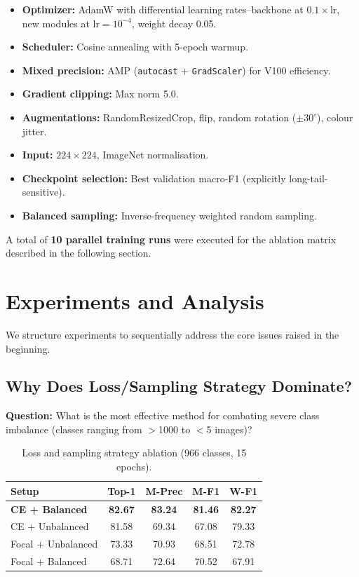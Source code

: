 \documentclass[10pt, twocolumn]{article}
\begin{document}
\begin{itemize}[leftmargin=*, topsep=2pt, itemsep=1pt]
    \item \textbf{Optimizer:} AdamW with differential learning rates--backbone at $0.1\times\text{lr}$, new modules at $\text{lr}=10^{-4}$, weight decay 0.05.
    \item \textbf{Scheduler:} Cosine annealing with 5-epoch warmup.
    \item \textbf{Mixed precision:} AMP (\texttt{autocast} + \texttt{GradScaler}) for V100 efficiency.
    \item \textbf{Gradient clipping:} Max norm 5.0.
    \item \textbf{Augmentations:} RandomResizedCrop, flip, random rotation ($\pm30^{\circ}$), colour jitter.
    \item \textbf{Input:} $224\times224$, ImageNet normalisation.
    \item \textbf{Checkpoint selection:} Best validation macro-F1 (explicitly long-tail-sensitive).
    \item \textbf{Balanced sampling:} Inverse-frequency weighted random sampling.
\end{itemize}

A total of \textbf{10 parallel training runs} were executed for the ablation matrix described in the following section.

\section{Experiments and Analysis}
\label{sec:experiments}

We structure experiments to sequentially address the core issues raised in the beginning.

\subsection{Why Does Loss/Sampling Strategy Dominate?}

\textbf{Question:} What is the most effective method for combating severe class imbalance (classes ranging from $>$1000 to $<$5 images)?

\begin{table}[H]
\centering
\caption{Loss and sampling strategy ablation (966 classes, 15 epochs).}
\label{tab:unit1}
\small
\begin{tabular}{@{}lcccc@{}}
\toprule
\textbf{Setup} & \textbf{Top-1} & \textbf{M-Prec} & \textbf{M-F1} & \textbf{W-F1} \\
\midrule
\textbf{CE + Balanced} & \textbf{82.67} & \textbf{83.24} & \textbf{81.46} & \textbf{82.27} \\
CE + Unbalanced        & 81.58 & 69.34 & 67.08 & 79.33 \\
Focal + Unbalanced     & 73.33 & 70.93 & 68.51 & 72.78 \\
Focal + Balanced       & 68.71 & 72.64 & 70.52 & 67.91 \\
\bottomrule
\end{tabular}
\end{table}
\end{document}
